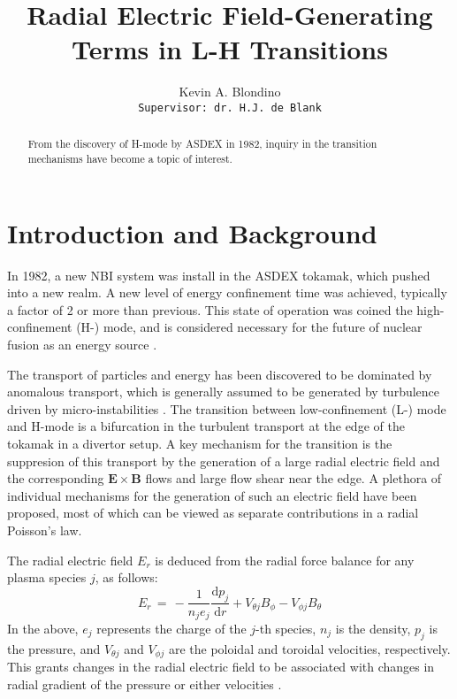 \documentclass{article}
\author{Kevin A. Blondino \\
	\texttt{Supervisor: dr. H.J. de Blank}}
\title{Radial Electric Field-Generating Terms in L-H Transitions}
\date{}
\newcommand\mynotes[1]{\textcolor{red}{#1}}
\begin{document}
\maketitle


\begin{abstract}
	\mynotes{\lipsum[1]}
	From the discovery of H-mode by ASDEX in 1982, inquiry in the transition mechanisms have become a topic of interest.
\end{abstract}

\section{Introduction and Background}
In 1982, a new NBI system was install in the ASDEX tokamak, which pushed into a new realm.
A new level of energy confinement time was achieved, typically a factor of 2 or more than previous.
This state of operation was coined the high-confinement (H-) mode, and is considered necessary for the future of nuclear fusion as an energy source \cite{wagner_development_1984}.

The transport of particles and energy has been discovered to be dominated by anomalous transport, which is generally assumed to be generated by turbulence driven by micro-instabilities \cite{freidberg_plasma_2007}.
The transition between low-confinement (L-) mode and H-mode is a bifurcation in the turbulent transport at the edge of the tokamak in a divertor setup.
A key mechanism for the transition is the suppresion of this transport by the generation of a large radial electric field and the corresponding $\mathbf{E}\times\mathbf{B}$ flows and large flow shear near the edge.
A plethora of individual mechanisms for the generation of such an electric field have been proposed, most of which can be viewed as separate contributions in a radial Poisson's law.

The radial electric field $E_r$ is deduced from the radial force balance for any plasma species $j$, as follows:
\begin{equation}
	E_r \,=\, -\frac{1}{n_j e_j} \frac{\text{d} p_j}{\text{d} r} + V_{\theta j} B_\phi - V_{\phi j} B_\theta
	\label{eq:E_r}
\end{equation}
In the above, $e_j$ represents the charge of the $j$-th species, $n_j$ is the density, $p_j$ is the pressure, and $V_{\theta j}$ and $V_{\phi j}$ are the poloidal and toroidal velocities, respectively.
This grants changes in the radial electric field to be associated with changes in radial gradient of the pressure or either velocities \cite{connor_review_2000}\cite{staps_backstepping_2017}.
\end{document}
